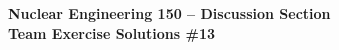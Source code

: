 \documentclass{report}
\begin{document}
\begin{center}
\textbf{\large Nuclear Engineering 150 -- Discussion Section}\\ 
\textbf{Team Exercise Solutions \#13}
\end{center}



\newpage




\end{document}
